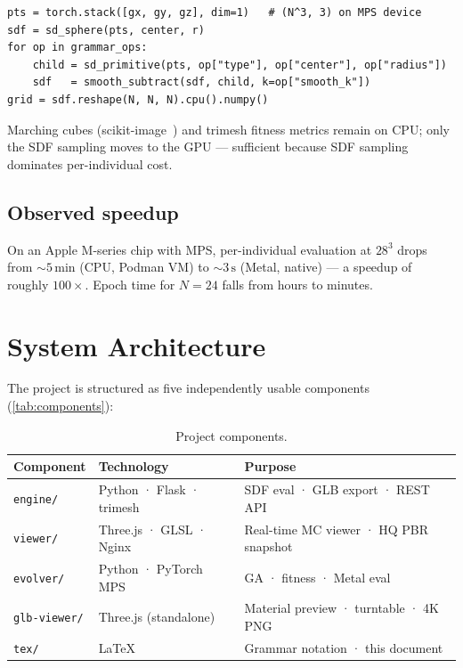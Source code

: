 \documentclass[11pt, a4paper]{article}
\newcommand{\code}[1]{\texttt{#1}}
\begin{document}
\begin{lstlisting}[caption={Vectorised SDF evaluation on MPS (simplified).}]
pts = torch.stack([gx, gy, gz], dim=1)   # (N^3, 3) on MPS device
sdf = sd_sphere(pts, center, r)
for op in grammar_ops:
    child = sd_primitive(pts, op["type"], op["center"], op["radius"])
    sdf   = smooth_subtract(sdf, child, k=op["smooth_k"])
grid = sdf.reshape(N, N, N).cpu().numpy()
\end{lstlisting}

Marching cubes (scikit-image~\cite{virtanen2020scipy}) and trimesh fitness
metrics remain on CPU; only the SDF sampling moves to the GPU — sufficient
because SDF sampling dominates per-individual cost.

\subsection{Observed speedup}
\label{subsec:speedup}

On an Apple M-series chip with MPS, per-individual evaluation at $28^3$
drops from ${\sim}5\,\mathrm{min}$ (CPU, Podman VM) to ${\sim}3\,\mathrm{s}$
(Metal, native) — a speedup of roughly $100\times$.
Epoch time for $N=24$ falls from hours to minutes.

\section{System Architecture}
\label{sec:architecture}

The project is structured as five independently usable components
(\autoref{tab:components}):

\begin{table}[h]
\centering
\caption{Project components.}
\label{tab:components}
\begin{tabular}{lll}
\toprule
Component & Technology & Purpose \\
\midrule
\code{engine/}     & Python · Flask · trimesh  & SDF eval · GLB export · REST API \\
\code{viewer/}     & Three.js · GLSL · Nginx   & Real-time MC viewer · HQ PBR snapshot \\
\code{evolver/}    & Python · PyTorch MPS      & GA · fitness · Metal eval \\
\code{glb-viewer/} & Three.js (standalone)     & Material preview · turntable · 4K PNG \\
\code{tex/}        & \LaTeX                    & Grammar notation · this document \\
\bottomrule
\end{tabular}
\end{table}
\end{document}
